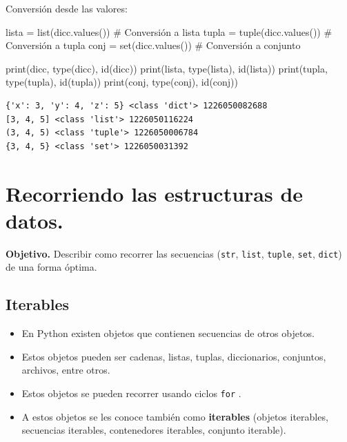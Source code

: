 \documentclass[
  spanish,
  letterpaper,
]{scrbook}
\newenvironment{Shaded}{\begin{snugshade}}{\end{snugshade}}
\newcommand{\BuiltInTok}[1]{\textcolor[rgb]{0.00,0.23,0.31}{#1}}
\newcommand{\CommentTok}[1]{\textcolor[rgb]{0.37,0.37,0.37}{#1}}
\newcommand{\NormalTok}[1]{\textcolor[rgb]{0.00,0.23,0.31}{#1}}
\newcommand{\OperatorTok}[1]{\textcolor[rgb]{0.37,0.37,0.37}{#1}}
\providecommand{\tightlist}{%
  \setlength{\itemsep}{0pt}\setlength{\parskip}{0pt}}
\theoremstyle{definition}
\theoremstyle{remark}
\begin{document}
Conversión desde las valores:

\begin{Shaded}
\begin{Highlighting}[]
\NormalTok{lista }\OperatorTok{=} \BuiltInTok{list}\NormalTok{(dicc.values())  }\CommentTok{\# Conversión a lista}
\NormalTok{tupla }\OperatorTok{=} \BuiltInTok{tuple}\NormalTok{(dicc.values()) }\CommentTok{\# Conversión a tupla}
\NormalTok{conj }\OperatorTok{=} \BuiltInTok{set}\NormalTok{(dicc.values())    }\CommentTok{\# Conversión a conjunto}

\BuiltInTok{print}\NormalTok{(dicc, }\BuiltInTok{type}\NormalTok{(dicc), }\BuiltInTok{id}\NormalTok{(dicc))}
\BuiltInTok{print}\NormalTok{(lista, }\BuiltInTok{type}\NormalTok{(lista), }\BuiltInTok{id}\NormalTok{(lista))}
\BuiltInTok{print}\NormalTok{(tupla, }\BuiltInTok{type}\NormalTok{(tupla), }\BuiltInTok{id}\NormalTok{(tupla))}
\BuiltInTok{print}\NormalTok{(conj, }\BuiltInTok{type}\NormalTok{(conj), }\BuiltInTok{id}\NormalTok{(conj))}
\end{Highlighting}
\end{Shaded}

\begin{verbatim}
{'x': 3, 'y': 4, 'z': 5} <class 'dict'> 1226050082688
[3, 4, 5] <class 'list'> 1226050116224
(3, 4, 5) <class 'tuple'> 1226050006784
{3, 4, 5} <class 'set'> 1226050031392
\end{verbatim}

\chapter{Recorriendo las estructuras de datos.}\label{sec-n-traversing}

\textbf{Objetivo.} Describir como recorrer las secuencias (\texttt{str},
\texttt{list}, \texttt{tuple}, \texttt{set}, \texttt{dict}) de una forma
óptima.

\section{Iterables}\label{iterables}

\begin{itemize}
\tightlist
\item
  En Python existen objetos que contienen secuencias de otros objetos.
\item
  Estos objetos pueden ser cadenas, listas, tuplas, diccionarios,
  conjuntos, archivos, entre otros.
\item
  Estos objetos se pueden recorrer usando ciclos \texttt{for} .
\item
  A estos objetos se les conoce también como \textbf{iterables} (objetos
  iterables, secuencias iterables, contenedores iterables, conjunto
  iterable).
\end{itemize}
\end{document}
